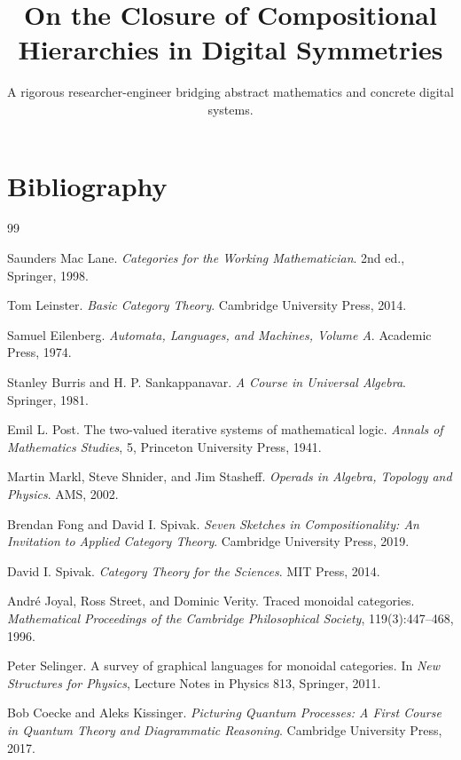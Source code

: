 \documentclass[11pt]{article}
\title{On the Closure of Compositional Hierarchies in Digital Symmetries}
\author{A rigorous researcher-engineer bridging abstract mathematics and concrete digital systems.}
\begin{document}
\section*{Bibliography}

\begin{thebibliography}{99}

Saunders Mac Lane.
\newblock \emph{Categories for the Working Mathematician}.
\newblock 2nd ed., Springer, 1998.

Tom Leinster.
\newblock \emph{Basic Category Theory}.
\newblock Cambridge University Press, 2014.

Samuel Eilenberg.
\newblock \emph{Automata, Languages, and Machines, Volume A}.
\newblock Academic Press, 1974.

Stanley Burris and H. P. Sankappanavar.
\newblock \emph{A Course in Universal Algebra}.
\newblock Springer, 1981.

Emil L. Post.
\newblock The two-valued iterative systems of mathematical logic.
\newblock \emph{Annals of Mathematics Studies}, 5, Princeton University Press, 1941.

Martin Markl, Steve Shnider, and Jim Stasheff.
\newblock \emph{Operads in Algebra, Topology and Physics}.
\newblock AMS, 2002.

Brendan Fong and David I. Spivak.
\newblock \emph{Seven Sketches in Compositionality: An Invitation to Applied Category Theory}.
\newblock Cambridge University Press, 2019.

David I. Spivak.
\newblock \emph{Category Theory for the Sciences}.
\newblock MIT Press, 2014.

Andr\'e Joyal, Ross Street, and Dominic Verity.
\newblock Traced monoidal categories.
\newblock \emph{Mathematical Proceedings of the Cambridge Philosophical Society}, 119(3):447--468, 1996.

Peter Selinger.
\newblock A survey of graphical languages for monoidal categories.
\newblock In \emph{New Structures for Physics}, Lecture Notes in Physics 813, Springer, 2011.

Bob Coecke and Aleks Kissinger.
\newblock \emph{Picturing Quantum Processes: A First Course in Quantum Theory and Diagrammatic Reasoning}.
\newblock Cambridge University Press, 2017.


\end{thebibliography}
\end{document}
